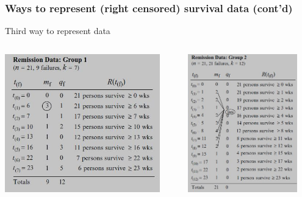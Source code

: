 \documentclass{beamer}
\theoremstyle{definition}
\begin{document}
\begin{frame}
\frametitle{Ways to represent (right censored) survival data (cont'd)}
\begin{block}{Third way to represent data }
\begin{columns}
    \begin{column}{0.48\textwidth}
        \includegraphics[width =\textwidth, height=6cm]{Ch1-leuk_data_a1.JPG}
    \end{column}
    \hspace{-10pt}
    \begin{column}{0.48\textwidth}
         \includegraphics[width =\textwidth, height=6cm]{Ch1-leuk_data_b1.JPG}
    \end{column}
\end{columns}
\end{block}
\end{frame}
\end{document}
